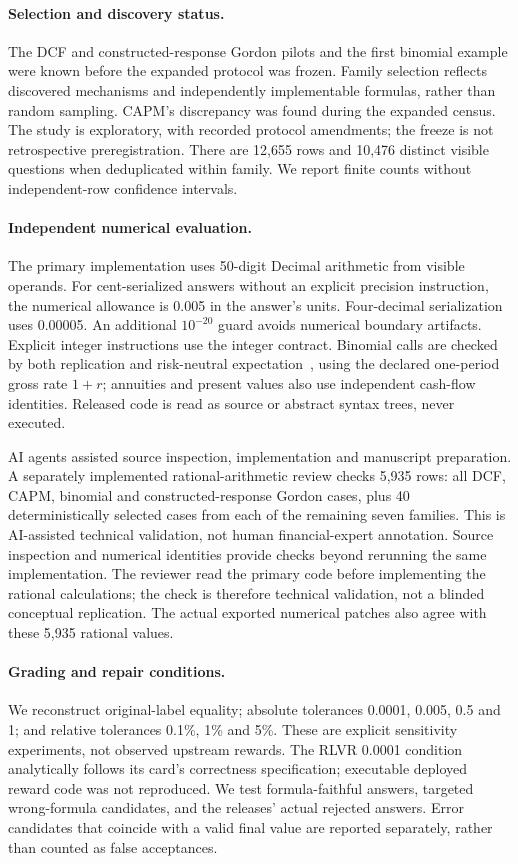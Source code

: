 \paragraph{Selection and discovery status.} The DCF and constructed-response Gordon pilots and the first binomial example were known before the expanded
protocol was frozen. Family selection reflects discovered mechanisms and independently implementable formulas, rather than random sampling. CAPM's discrepancy was found during the expanded census. The study is
exploratory, with recorded protocol amendments; the freeze is not retrospective preregistration. There are 12,655 rows and 10,476 distinct visible questions when deduplicated within family. We report finite
counts without independent-row confidence intervals.

\paragraph{Independent numerical evaluation.} The primary implementation uses 50-digit Decimal arithmetic from visible operands. For cent-serialized answers
without an explicit precision instruction, the numerical allowance is 0.005 in the answer's units. Four-decimal serialization uses 0.00005. An additional $10^{-20}$ guard avoids numerical boundary artifacts.
Explicit integer instructions use the integer contract. Binomial calls are checked by both replication and risk-neutral expectation~\cite{crr}, using the declared one-period gross rate $1+r$; annuities and
present values also use independent cash-flow identities. Released code is read as source or abstract syntax trees, never executed.

AI agents assisted source inspection, implementation and manuscript preparation. A separately implemented rational-arithmetic review checks 5,935 rows: all DCF, CAPM, binomial and constructed-response Gordon cases, plus 40 deterministically selected cases from each of the remaining seven
families. This is AI-assisted technical validation, not human financial-expert annotation. Source inspection and numerical identities provide checks beyond rerunning the same implementation. The reviewer read
the primary code before implementing the rational calculations; the check is therefore technical validation, not a blinded conceptual replication. The actual exported numerical patches also agree with these
5,935 rational values.

\paragraph{Grading and repair conditions.} We reconstruct original-label equality; absolute tolerances 0.0001, 0.005, 0.5 and 1; and relative tolerances 0.1\%,
1\% and 5\%. These are explicit sensitivity experiments, not observed upstream rewards. The RLVR 0.0001 condition analytically follows its card's correctness specification; executable deployed reward code was
not reproduced. We test formula-faithful answers, targeted wrong-formula candidates, and the releases' actual rejected answers. Error candidates that coincide with a valid final value are reported separately,
rather than counted as false acceptances.

